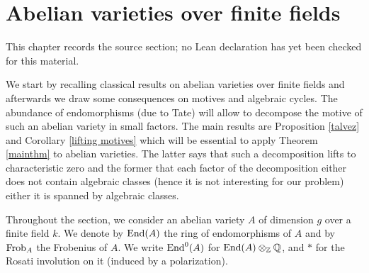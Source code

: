 \chapter{Abelian varieties over finite fields}
\label{standard-conjectures-abelian-fourfolds-chapter-06}

\begin{remark}
\label{standard-conjectures-abelian-fourfolds-chapter-06-source}
This chapter records the source section; no Lean declaration has yet been checked for this material.
\notready
\end{remark}

\label{finitefields}




We start by recalling classical results on abelian varieties over finite fields and afterwards we draw some consequences on motives and algebraic cycles. The abundance of endomorphisms (due to Tate) will allow to decompose the motive of such an abelian variety in small factors. The main results  are Proposition \ref{talvez} and Corollary \ref{lifting motives} which will be essential to apply Theorem \ref{mainthm} to abelian varieties. The latter  says that such a decomposition lifts to characteristic zero and the former that each factor of the decomposition either does not contain algebraic classes (hence it is not interesting for our problem) either it is spanned by algebraic classes.

Throughout the section, we consider an abelian variety $A$ of dimension $g$ over a finite field $k$. We denote by $\textnormal{End}(A)$ the ring of endomorphisms of $A$ and by $\textnormal{Frob}_A$ the Frobenius of $A$. We write $\textnormal{End}^0(A)$ for $\textnormal{End}(A)\otimes_{\mathbb{Z}} \mathbb{Q}$,  and $*$ for the Rosati involution on it (induced by a polarization).

